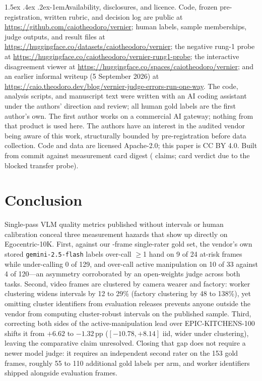 \documentclass[11pt]{article}
\makeatletter
\renewcommand\paragraph{\@startsection{paragraph}{4}{\z@}%
  {1.5ex \@plus .4ex \@minus .2ex}{-1em}{\normalfont\normalsize\bfseries}}
\makeatother
\begin{document}
\paragraph{Availability, disclosures, and licence.}
Code, frozen pre-registration, written rubric, and decision log are public at
\url{https://github.com/caiotheodoro/vernier}; human labels, sample memberships, judge outputs,
and result files at \url{https://huggingface.co/datasets/caiotheodoro/vernier}; the negative
rung-1 probe at \url{https://huggingface.co/caiotheodoro/vernier-rung1-probe}; the interactive
disagreement viewer at \url{https://huggingface.co/spaces/caiotheodoro/vernier}; and an earlier
informal writeup (5 September 2026) at
\url{https://caio.theodoro.dev/blog/vernier-judge-errors-run-one-way}. The code, analysis scripts,
and manuscript text were written with an AI coding assistant under the authors' direction and
review; all human gold labels are the first author's own. The first author works on a commercial AI gateway;
nothing from that product is used here. The authors have an interest in the audited vendor being
aware of this work, structurally bounded by pre-registration before data collection. Code and data
are licensed Apache-2.0; this paper is CC BY 4.0. Built from commit \texttt{\vernierGitRev}
against measurement card digest \texttt{\vernierCardDigest} (\vernierNClaims{} claims; card
verdict \texttt{\vernierVerdict} due to the blocked transfer probe).

\section{Conclusion}
\label{sec:conclusion}

Single-pass VLM quality metrics published without intervals or human calibration conceal three
measurement hazards that show up directly on Egocentric-10K. First, against our \vernierNPrimary{}-frame
single-rater gold set, the vendor's own stored \texttt{gemini-2.5-flash} labels over-call $\geq$1
hand on 9 of 24 at-risk frames while under-calling 0 of 129, and over-call active manipulation on
10 of 33 against 4 of 120---an asymmetry corroborated by an open-weights judge across both tasks.
Second, video frames are clustered by camera wearer and factory: worker clustering widens
intervals by 12 to 29\% (factory clustering by 48 to 138\%), yet omitting cluster identifiers from
evaluation releases prevents anyone outside the vendor from computing cluster-robust intervals on
the published sample. Third, correcting both sides of the active-manipulation lead over
EPIC-KITCHENS-100 shifts it from $+6.62$ to $-1.32$\,pp ($[-10.78, +8.14]$ iid, wider under
clustering), leaving the comparative claim unresolved. Closing that gap does not require a newer
model judge: it requires an independent second rater on the 153 gold frames, roughly 55 to 110
additional gold labels per arm, and worker identifiers shipped alongside evaluation frames.
\end{document}
